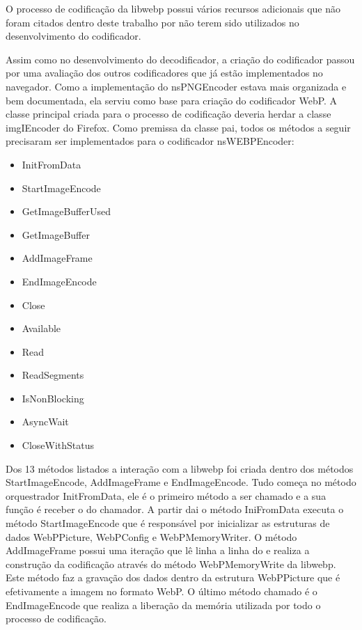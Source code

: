 \documentclass[espaco=simples,appendix=Name]{abnt}
\begin{document}
O processo de codificação da libwebp possui vários recursos adicionais que não foram citados dentro deste trabalho por não terem sido utilizados no desenvolvimento do codificador.

Assim como no desenvolvimento do decodificador, a criação do codificador passou por uma avaliação dos outros codificadores que já estão implementados no navegador. Como a implementação do nsPNGEncoder estava mais organizada e bem documentada, ela serviu como base para criação do codificador WebP. A classe principal criada para o processo de codificação deveria herdar a classe imgIEncoder do Firefox. Como premissa da classe pai, todos os métodos a seguir precisaram ser implementados para o codificador nsWEBPEncoder:

\begin{itemize}
	\item InitFromData
	\item StartImageEncode
	\item GetImageBufferUsed
	\item GetImageBuffer
	\item AddImageFrame
	\item EndImageEncode
	\item Close
	\item Available
	\item Read
	\item ReadSegments
	\item IsNonBlocking
	\item AsyncWait
	\item CloseWithStatus
\end{itemize}

Dos 13 métodos listados a interação com a libwebp foi criada dentro dos métodos StartImageEncode, AddImageFrame e EndImageEncode. Tudo começa no método orquestrador InitFromData, ele é o primeiro método a ser chamado e a sua função é receber o  do chamador. A partir dai o método IniFromData executa o método StartImageEncode que é responsável por inicializar as estruturas de dados WebPPicture, WebPConfig e WebPMemoryWriter. O método AddImageFrame possui uma iteração que lê linha a linha do  e realiza a construção da codificação através do método WebPMemoryWrite da libwebp. Este método faz a gravação dos dados dentro da estrutura WebPPicture que é efetivamente a imagem no formato WebP. O último método chamado é o EndImageEncode que realiza a liberação da memória utilizada por todo o processo de codificação.
\end{document}
